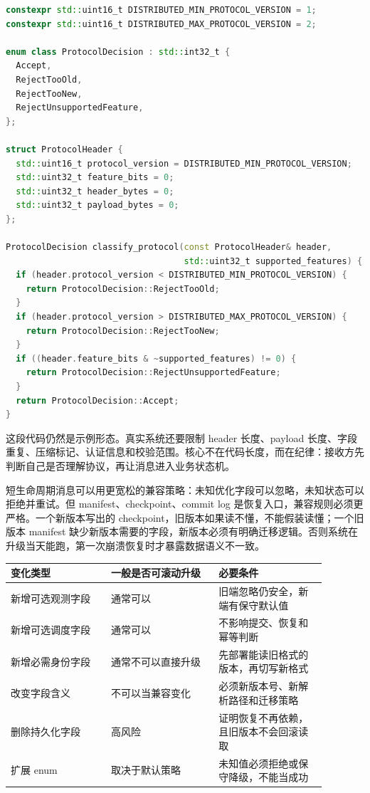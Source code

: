 \begin{lstlisting}[language=C++,caption={协议兼容判断的示例形态}]
constexpr std::uint16_t DISTRIBUTED_MIN_PROTOCOL_VERSION = 1;
constexpr std::uint16_t DISTRIBUTED_MAX_PROTOCOL_VERSION = 2;

enum class ProtocolDecision : std::int32_t {
  Accept,
  RejectTooOld,
  RejectTooNew,
  RejectUnsupportedFeature,
};

struct ProtocolHeader {
  std::uint16_t protocol_version = DISTRIBUTED_MIN_PROTOCOL_VERSION;
  std::uint32_t feature_bits = 0;
  std::uint32_t header_bytes = 0;
  std::uint32_t payload_bytes = 0;
};

ProtocolDecision classify_protocol(const ProtocolHeader& header,
                                   std::uint32_t supported_features) {
  if (header.protocol_version < DISTRIBUTED_MIN_PROTOCOL_VERSION) {
    return ProtocolDecision::RejectTooOld;
  }
  if (header.protocol_version > DISTRIBUTED_MAX_PROTOCOL_VERSION) {
    return ProtocolDecision::RejectTooNew;
  }
  if ((header.feature_bits & ~supported_features) != 0) {
    return ProtocolDecision::RejectUnsupportedFeature;
  }
  return ProtocolDecision::Accept;
}
\end{lstlisting}

这段代码仍然是示例形态。真实系统还要限制 header 长度、payload 长度、字段重复、压缩标记、认证信息和校验范围。核心不在代码长度，而在纪律：接收方先判断自己是否理解协议，再让消息进入业务状态机。

短生命周期消息可以用更宽松的兼容策略：未知优化字段可以忽略，未知状态可以拒绝并重试。但 manifest、checkpoint、commit log 是恢复入口，兼容规则必须更严格。一个新版本写出的 checkpoint，旧版本如果读不懂，不能假装读懂；一个旧版本 manifest 缺少新版本需要的字段，新版本必须有明确迁移逻辑。否则系统在升级当天能跑，第一次崩溃恢复时才暴露数据语义不一致。

\begin{center}
\begin{tabular}{p{0.28\linewidth}p{0.30\linewidth}p{0.30\linewidth}}
\toprule
变化类型 & 一般是否可滚动升级 & 必要条件 \\
\midrule
新增可选观测字段 & 通常可以 & 旧端忽略仍安全，新端有保守默认值 \\
新增可选调度字段 & 通常可以 & 不影响提交、恢复和幂等判断 \\
新增必需身份字段 & 通常不可以直接升级 & 先部署能读旧格式的版本，再切写新格式 \\
改变字段含义 & 不可以当兼容变化 & 必须新版本号、新解析路径和迁移策略 \\
删除持久化字段 & 高风险 & 证明恢复不再依赖，且旧版本不会回滚读取 \\
扩展 enum & 取决于默认策略 & 未知值必须拒绝或保守降级，不能当成功 \\
\bottomrule
\end{tabular}
\end{center}

